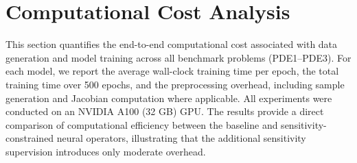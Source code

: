 \appendix
\section*{Computational Cost Analysis}
\label{sec:cpu_time}
\renewcommand{\thefigure}{I.\arabic{figure}}  %
\renewcommand{\thetable}{I.\arabic{table}}  %

This section quantifies the end-to-end computational cost associated with data generation and model training across all benchmark problems (PDE1–PDE3). For each model, we report the average wall-clock training time per epoch, the total training time over 500 epochs, and the preprocessing overhead, including sample generation and Jacobian computation where applicable. All experiments were conducted on an NVIDIA A100 (32 GB) GPU. The results provide a direct comparison of computational efficiency between the baseline and sensitivity-constrained neural operators, illustrating that the additional sensitivity supervision introduces only moderate overhead.


